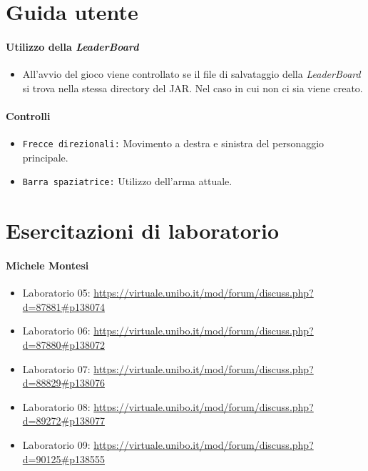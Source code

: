 \documentclass[a4paper,12pt]{report}
\begin{document}
\begin{appendices}
\chapter{Guida utente}
\subsubsection{Utilizzo della \emph{LeaderBoard}}
\begin{itemize}
    \item All'avvio del gioco viene controllato se il file di salvataggio della \emph{LeaderBoard} si trova nella stessa directory del JAR. Nel caso in cui non ci sia viene creato.
\end{itemize}

\subsubsection{Controlli}
\begin{itemize}
    \item \texttt{Frecce direzionali:} Movimento a destra e sinistra del personaggio principale.
    \item \texttt{Barra spaziatrice:} Utilizzo dell'arma attuale.
\end{itemize}


\chapter{Esercitazioni di laboratorio}
\subsubsection{Michele Montesi}

\begin{itemize}
    \item Laboratorio 05: \url{https://virtuale.unibo.it/mod/forum/discuss.php?d=87881#p138074}
    \item Laboratorio 06: \url{https://virtuale.unibo.it/mod/forum/discuss.php?d=87880#p138072}
    \item Laboratorio 07: \url{https://virtuale.unibo.it/mod/forum/discuss.php?d=88829#p138076}
    \item Laboratorio 08: \url{https://virtuale.unibo.it/mod/forum/discuss.php?d=89272#p138077}
    \item Laboratorio 09: \url{https://virtuale.unibo.it/mod/forum/discuss.php?d=90125#p138555}
\end{itemize}


\end{appendices}
\end{document}
